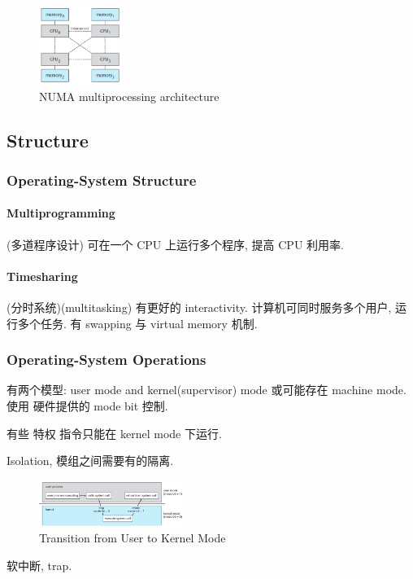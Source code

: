 \begin{figure}[!htb]
    \centering
    \includegraphics[width=0.24\textwidth]{pic/OS1/NUMA multiprocessing architecture}
    \caption{NUMA multiprocessing architecture}
\end{figure}



\subsection{Structure}
\subsubsection{Operating-System Structure}
\paragraph{Multiprogramming}(多道程序设计) 可在一个 CPU 上运行多个程序, 提高 CPU 利用率. 

\paragraph{Timesharing}(分时系统)(multitasking) 有更好的 interactivity. 计算机可同时服务多个用户, 运行多个任务. 有 swapping 与 virtual memory 机制. 



\subsubsection{Operating-System Operations}
有两个模型: user mode and kernel(supervisor) mode 或可能存在 machine mode. 使用 硬件提供的 mode bit 控制. 

有些 特权 指令只能在 kernel mode 下运行. 

Isolation, 模组之间需要有的隔离. 

\begin{figure}[!htb]
    \centering
    \includegraphics[width=0.42\textwidth]{pic/OS1/Transition from User to Kernel Mode.png}
    \caption{Transition from User to Kernel Mode}
\end{figure}
软中断, trap. 

